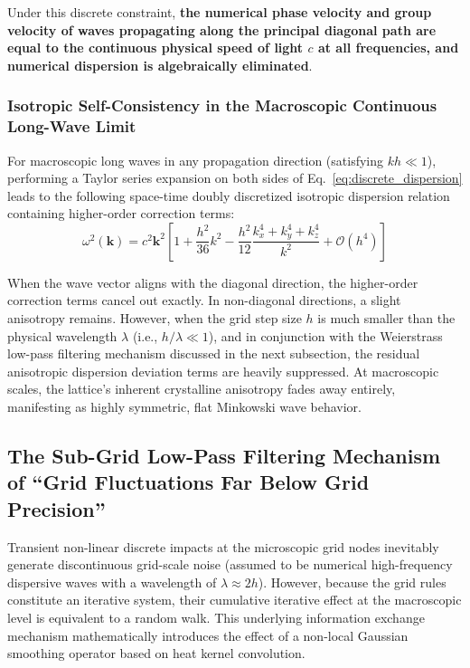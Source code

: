 \documentclass[12pt, a4paper]{article}
\begin{document}
Under this discrete constraint, \textbf{the numerical phase velocity and group velocity of waves propagating along the principal diagonal path are equal to the continuous physical speed of light $c$ at all frequencies, and numerical dispersion is algebraically eliminated}.

\subsubsection{Isotropic Self-Consistency in the Macroscopic Continuous Long-Wave Limit}

For macroscopic long waves in any propagation direction (satisfying $kh \ll 1$), performing a Taylor series expansion on both sides of Eq.~\eqref{eq:discrete_dispersion} leads to the following space-time doubly discretized isotropic dispersion relation containing higher-order correction terms:
\begin{equation}
\label{eq:taylor_dispersion}
\omega^2(\mathbf{k}) = c^2 \mathbf{k}^2 \left[ 1 + \frac{h^2}{36} k^2 - \frac{h^2}{12} \frac{k_x^4 + k_y^4 + k_z^4}{k^2} + \mathcal{O}(h^4) \right]
\end{equation}

When the wave vector aligns with the diagonal direction, the higher-order correction terms cancel out exactly. In non-diagonal directions, a slight anisotropy remains. However, when the grid step size $h$ is much smaller than the physical wavelength $\lambda$ (i.e., $h/\lambda \ll 1$), and in conjunction with the Weierstrass low-pass filtering mechanism discussed in the next subsection, the residual anisotropic dispersion deviation terms are heavily suppressed. At macroscopic scales, the lattice's inherent crystalline anisotropy fades away entirely, manifesting as highly symmetric, flat Minkowski wave behavior.

\subsection{The Sub-Grid Low-Pass Filtering Mechanism of ``Grid Fluctuations Far Below Grid Precision''}

Transient non-linear discrete impacts at the microscopic grid nodes inevitably generate discontinuous grid-scale noise (assumed to be numerical high-frequency dispersive waves with a wavelength of $\lambda \approx 2h$). However, because the grid rules constitute an iterative system, their cumulative iterative effect at the macroscopic level is equivalent to a random walk. This underlying information exchange mechanism mathematically introduces the effect of a non-local Gaussian smoothing operator based on heat kernel convolution.
\end{document}
